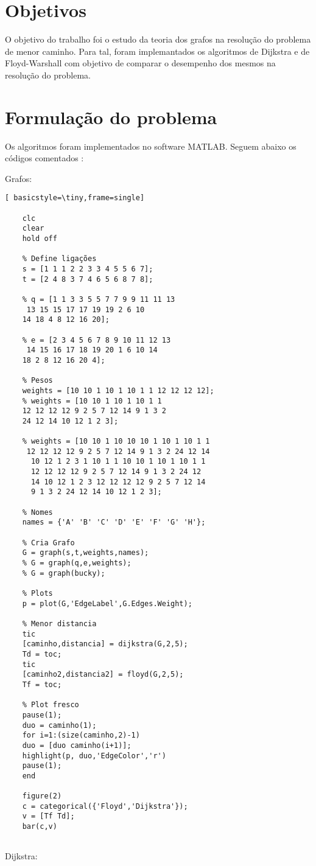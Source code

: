 \documentclass[
12pt,				%
openright,			%
oneside,			%
a4paper,			%
english,			%
french,				%
spanish,			%
brazil,				%
]{abntex2}
\begin{document}
	
	
	
	
	
	
	\chapter{Objetivos}
	
	O objetivo do trabalho foi o estudo da teoria dos grafos na resolução do problema de menor caminho. Para tal, foram implemantados os algoritmos de Dijkstra e de Floyd-Warshall com objetivo de comparar o desempenho dos mesmos na resolução do problema.
	
	
	\chapter{Formulação do problema}
	
	Os algoritmos foram implementados no software MATLAB. Seguem abaixo os códigos comentados :
	
	Grafos:
	
	\begin{lstlisting}[ basicstyle=\tiny,frame=single]
	
	clc 
	clear
	hold off
	
	% Define ligações
	s = [1 1 1 2 2 3 3 4 5 5 6 7]; 
	t = [2 4 8 3 7 4 6 5 6 8 7 8]; 
	
	% q = [1 1 3 3 5 5 7 7 9 9 11 11 13
	 13 15 15 17 17 19 19 2 6 10 
	14 18 4 8 12 16 20];
	
	% e = [2 3 4 5 6 7 8 9 10 11 12 13
	 14 15 16 17 18 19 20 1 6 10 14 
	18 2 8 12 16 20 4];
	
	% Pesos
	weights = [10 10 1 10 1 10 1 1 12 12 12 12];
	% weights = [10 10 1 10 1 10 1 1 
	12 12 12 12 9 2 5 7 12 14 9 1 3 2
	24 12 14 10 12 1 2 3];
	
	% weights = [10 10 1 10 10 10 1 10 1 10 1 1
	 12 12 12 12 9 2 5 7 12 14 9 1 3 2 24 12 14
	  10 12 1 2 3 1 10 1 1 10 10 1 10 1 10 1 1 
	  12 12 12 12 9 2 5 7 12 14 9 1 3 2 24 12 
	  14 10 12 1 2 3 12 12 12 12 9 2 5 7 12 14 
	  9 1 3 2 24 12 14 10 12 1 2 3];
	
	% Nomes
	names = {'A' 'B' 'C' 'D' 'E' 'F' 'G' 'H'};
	
	% Cria Grafo
	G = graph(s,t,weights,names);
	% G = graph(q,e,weights);
	% G = graph(bucky);
	
	% Plots
	p = plot(G,'EdgeLabel',G.Edges.Weight);
	
	% Menor distancia
	tic
	[caminho,distancia] = dijkstra(G,2,5);
	Td = toc;
	tic
	[caminho2,distancia2] = floyd(G,2,5);
	Tf = toc;
	
	% Plot fresco
	pause(1);
	duo = caminho(1);
	for i=1:(size(caminho,2)-1)
	duo = [duo caminho(i+1)];
	highlight(p, duo,'EdgeColor','r')
	pause(1);
	end
	
	figure(2)
	c = categorical({'Floyd','Dijkstra'});
	v = [Tf Td];
	bar(c,v)
	
	\end{lstlisting}
	Dijkstra:
	
\end{document}
